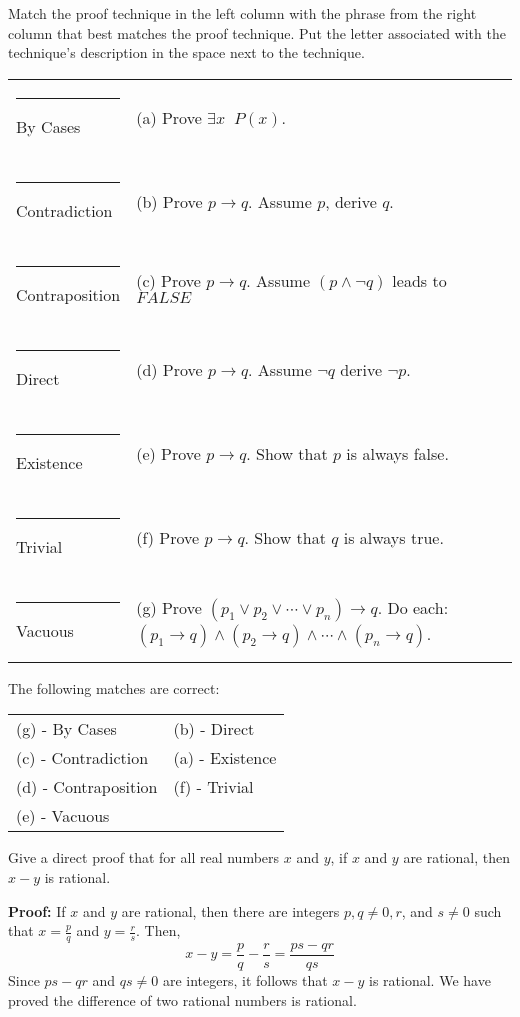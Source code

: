 \documentclass[12pt,addpoints]{exam}
\newcommand{\ra}{\rightarrow}
\begin{document}
\begin{questions}
\question Match the proof technique in the left column with the
phrase from the right column that best matches the proof technique.
Put the letter associated with the technique's description in the
space next to the technique.

\footnotesize
\begin{tabular}{p{1.8in}p{3.7in}}
\rule{0.7in}{.01in} By Cases        & (a) Prove $\exists x\;\; P(x)$. \\
&\\[10pt]
\rule{0.7in}{.01in} Contradiction   & (b) Prove $p \ra q$. Assume $p$, derive $q$. \\
&\\[10pt]
\rule{0.7in}{.01in} Contraposition  & (c) Prove $p \ra q$. Assume $(p \wedge \neg q)$ leads to $FALSE$ \\
&\\[10pt]
\rule{0.7in}{.01in} Direct          & (d) Prove $p \ra q$. Assume $\neg q$ derive $\neg p$.\\
&\\[10pt]
\rule{0.7in}{.01in} Existence       & (e) Prove $p \ra q$. Show that $p$ is always false.\\
&\\[10pt]
\rule{0.7in}{.01in} Trivial         & (f) Prove $p \ra q$. Show that $q$ is always true. \\
&\\[10pt]
\rule{0.7in}{.01in} Vacuous         & (g) Prove $(p_1 \vee p_2 \vee
\cdots \vee p_n) \ra q$. Do each:
$(p_1 \ra q) \wedge (p_2 \ra q) \wedge \cdots \wedge (p_n \ra q)$. \\
\end{tabular}
\normalsize

    \begin{solution}
    The following matches are correct: \\
    \begin{tabular}{ll}
        (g) - By Cases          & (b) - Direct \\
        (c) - Contradiction     & (a) - Existence  \\
        (d) - Contraposition    & (f) - Trivial \\
        (e) - Vacuous & \\
    \end{tabular}
    \end{solution}

\question Give a direct proof that for all real numbers $x$ and $y$,
if $x$ and $y$ are rational, then $x-y$ is rational.
    \begin{solution}
    \textbf{Proof:} If $x$ and $y$ are rational, then there are
    integers $p, q\neq 0, r$, and $s\neq 0$ such that
    $x = \frac{p}{q}$ and $y = \frac{r}{s}$.  Then,
    \[ x - y = \frac{p}{q} - \frac{r}{s} = \frac{ps - qr}{qs} \]
    Since $ps - qr$ and $qs \neq 0$ are integers, it follows
    that $x - y$ is rational.  We have proved the difference of
    two rational numbers is rational.
    \end{solution}


\end{questions}
\end{document}
